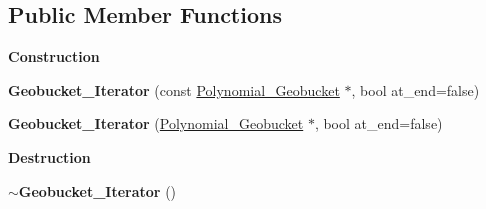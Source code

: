 \subsection*{Public Member Functions}
\begin{Indent}\textbf{ Construction}\par
\begin{DoxyCompactItemize}
\item 
\mbox{\label{class_geobucket___iterator_a1cf41a066244e2f0b6919f8e1b3d799d}} 
{\bfseries Geobucket\+\_\+\+Iterator} (const \hyperlink{class_polynomial___geobucket}{Polynomial\+\_\+\+Geobucket} $\ast$, bool at\+\_\+end=false)
\item 
\mbox{\label{class_geobucket___iterator_a9aef2105e723b8c2d52f5030d437f005}} 
{\bfseries Geobucket\+\_\+\+Iterator} (\hyperlink{class_polynomial___geobucket}{Polynomial\+\_\+\+Geobucket} $\ast$, bool at\+\_\+end=false)
\end{DoxyCompactItemize}
\end{Indent}
\begin{Indent}\textbf{ Destruction}\par
\begin{DoxyCompactItemize}
\item 
\mbox{\label{class_geobucket___iterator_a474cb782876a334af8a4cd6c3f9f989c}} 
{\bfseries $\sim$\+Geobucket\+\_\+\+Iterator} ()
\end{DoxyCompactItemize}
\end{Indent}
